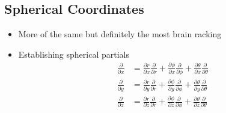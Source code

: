 \documentclass{article}
\begin{document}
\subsection{Spherical Coordinates}
\begin{itemize}
    \item More of the same but definitely the most brain racking
    \item Establishing spherical partials
        \begin{align}
            \frac{\partial}{\partial x} &= \frac{\partial r}{\partial x}\frac{\partial}{\partial r} +
 \frac{\partial \phi}{\partial x}\frac{\partial}{\partial \phi} +
\frac{\partial \theta}{\partial x}\frac{\partial}{\partial \theta}  \\
            \frac{\partial}{\partial y} &= \frac{\partial r}{\partial y}\frac{\partial}{\partial r} +
 \frac{\partial \phi}{\partial y}\frac{\partial}{\partial \phi} +
\frac{\partial \theta}{\partial y}\frac{\partial}{\partial \theta}  \\
            \frac{\partial}{\partial z} &= \frac{\partial r}{\partial z}\frac{\partial}{\partial r} +
 \frac{\partial \phi}{\partial z}\frac{\partial}{\partial \phi} +
\frac{\partial \theta}{\partial z}\frac{\partial}{\partial \theta}
        \end{align}
\end{itemize}
\end{document}
